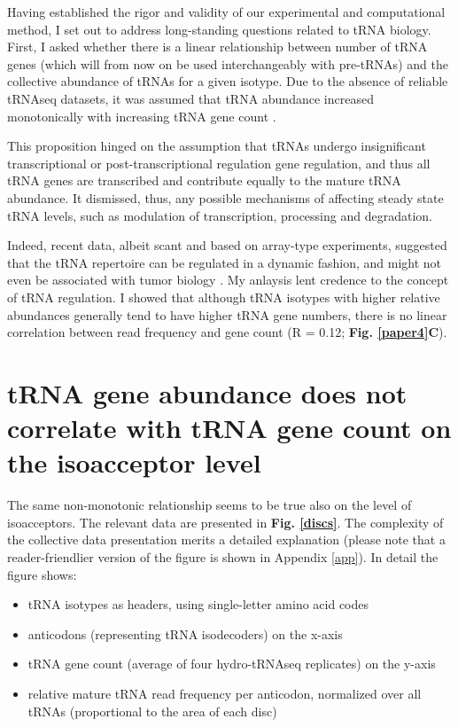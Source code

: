 \documentclass[12pt]{rockefeller}
\begin{document}
Having established the rigor and validity of our experimental and computational method, I set out to address long-standing questions related to tRNA biology. First, I asked whether there is a linear relationship between number of tRNA genes (which will from now on be used interchangeably with pre-tRNAs) and the collective abundance of tRNAs for a given isotype. Due to the absence of reliable tRNAseq datasets, it was assumed that tRNA abundance increased monotonically with increasing tRNA gene count \cite{Iben:2014dt,Pechmann:2012ey,Tuller:2010ge}. 

This proposition hinged on the assumption that tRNAs undergo insignificant transcriptional or post-transcriptional regulation gene regulation, and thus all tRNA genes are transcribed and contribute equally to the mature tRNA abundance. It dismissed, thus, any possible mechanisms of affecting steady state tRNA levels, such as modulation of transcription, processing and degradation. 

Indeed, recent data, albeit scant and based on array-type experiments, suggested that the tRNA repertoire can be regulated in a dynamic fashion, and might not even be associated with tumor biology \cite{Gingold:2014iz}. My anlaysis lent credence to the concept of tRNA regulation. I showed that although tRNA isotypes with higher relative abundances generally tend to have higher tRNA gene numbers, there is no linear correlation between read frequency and gene count (R = 0.12; \textbf{Fig. \ref{paper4}C}).

\section{tRNA gene abundance does not correlate with tRNA gene count on the isoacceptor level}
The same non-monotonic relationship seems to be true also on the level of \gls{isoacceptors}. The relevant data are presented in \textbf{Fig. \ref{discs}}. 
The complexity of the collective data presentation merits a detailed explanation (please note that a reader-friendlier version of the figure is shown in Appendix \ref{app}). In detail the figure shows:

\begin{itemize}
\item tRNA isotypes as headers, using single-letter amino acid codes
\item anticodons (representing tRNA isodecoders) on the x-axis
\item tRNA gene count (average of four hydro-tRNAseq replicates) on the y-axis
\item relative mature tRNA read frequency per anticodon, normalized over all tRNAs (proportional to the area of each disc)
\end{itemize}
\end{document}
